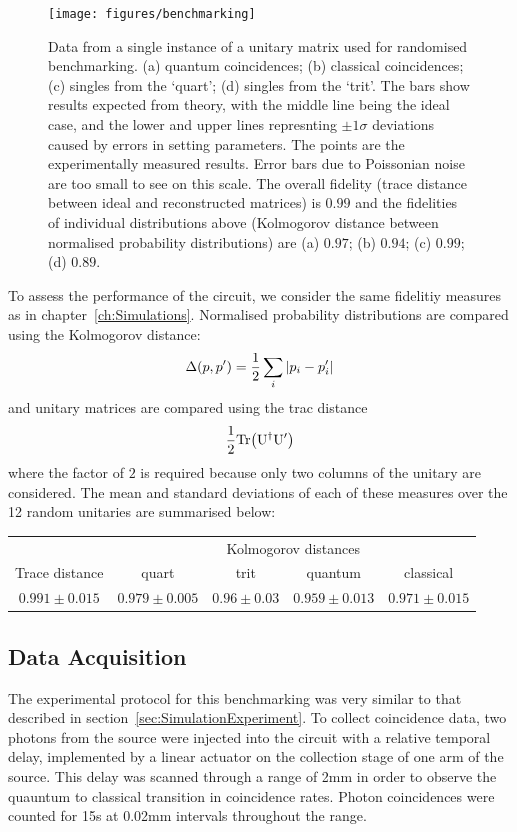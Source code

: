 \begin{figure}[t]
  \texttt{[image: figures/benchmarking]}
  \caption[Sample data from randomised benchmarking]
  {Data from a single instance of a unitary matrix used for randomised
  benchmarking. (a) quantum coincidences; (b) classical coincidences; (c)
  singles from the `quart'; (d) singles from the `trit'. The bars show results 
  expected from theory, with the middle line being the ideal case, and the lower
  and upper lines represnting \(\pm 1\sigma\) deviations caused by errors in
  setting parameters. The points are the experimentally measured results. Error
  bars due to Poissonian noise are too small to see on this scale. The overall
  fidelity (trace distance between ideal and reconstructed matrices) is \(0.99\)
  and the fidelities of individual distributions above (Kolmogorov distance
  between normalised probability distributions) are (a) \(0.97\); (b) \(0.94\);
  (c) \(0.99\); (d) \(0.89\).}
  \label{fig:benchmarking}
\end{figure}

To assess the performance of the circuit, we consider the same fidelitiy
measures as in chapter~\ref{ch:Simulations}. Normalised probability
distributions are compared using the Kolmogorov distance:
\begin{equation}
  \Delta \!\left( p,p^{\prime} \right) = \frac{1}{2} \sum_{i} \left|p_{i} - p_{i}^{\prime}\right|
\end{equation}
and unitary matrices are compared using the trac distance
\begin{equation}
  \frac{1}{2} \mathrm{Tr} \!\left( \mathrm{U}^{\dagger} \mathrm{U}^{\prime} \right)
\end{equation}
where the factor of \(2\) is required because only two columns of the unitary
are considered. The mean and standard deviations of each of these measures over
the 12 random unitaries are summarised below:

\begin{tabular}{|c|c|c|c|c|}
  \hline
  & \multicolumn{4}{|c|}{Kolmogorov distances} \\
  \cline{2-5}
  Trace distance & quart & trit & quantum & classical \\
  \hline
  \(0.991 \pm 0.015\) & \(0.979 \pm 0.005\) & \(0.96 \pm 0.03\) & \(0.959 \pm
  0.013\) & \(0.971 \pm 0.015\) \\
  \hline
\end{tabular}

\subsection{Data Acquisition}
\label{sec:BenchmarkingExperiment}
The experimental protocol for this benchmarking was very similar to that
described in section~\ref{sec:SimulationExperiment}. To collect coincidence
data, two photons from the source were injected into the circuit with a relative
temporal delay, implemented by a linear actuator on the collection stage of one
arm of the source. This delay was scanned through a range of 2mm in order to
observe the quauntum to classical transition in coincidence rates. Photon
coincidences were counted for 15s at 0.02mm intervals throughout the range.

